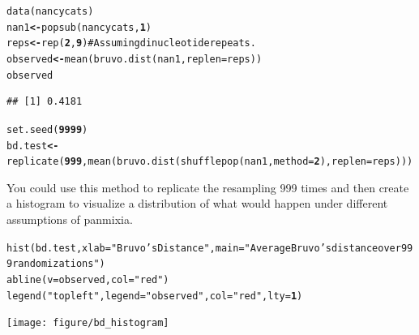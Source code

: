 \documentclass[letterpaper]{article}\usepackage[]{graphicx}\usepackage[]{color}
\makeatletter
\newcommand{\hlnum}[1]{\textcolor[rgb]{0.502,0,0.502}{\textbf{#1}}}%
\newcommand{\hlstr}[1]{\textcolor[rgb]{0.651,0.522,0}{#1}}%
\newcommand{\hlcom}[1]{\textcolor[rgb]{1,0.502,0}{#1}}%
\newcommand{\hlstd}[1]{\textcolor[rgb]{0,0,0}{#1}}%
\newcommand{\hlkwb}[1]{\textcolor[rgb]{0.502,0.502,0.753}{\textbf{#1}}}%
\newcommand{\hlkwc}[1]{\textcolor[rgb]{0,0.502,0.753}{#1}}%
\newcommand{\hlkwd}[1]{\textcolor[rgb]{0,0.267,0.4}{#1}}%
\newenvironment{kframe}{%
 \def\at@end@of@kframe{}%
 \ifinner\ifhmode%
  \def\at@end@of@kframe{\end{minipage}}%
  \begin{minipage}{\columnwidth}%
 \fi\fi%
 \def\FrameCommand##1{\hskip\@totalleftmargin \hskip-\fboxsep
 \colorbox{shadecolor}{##1}\hskip-\fboxsep
     \hskip-\linewidth \hskip-\@totalleftmargin \hskip\columnwidth}%
 \MakeFramed {\advance\hsize-\width
   \@totalleftmargin\z@ \linewidth\hsize
   \@setminipage}}%
 {\par\unskip\endMakeFramed%
 \at@end@of@kframe}
\newenvironment{knitrout}{}{} %
\makeatother
\begin{document}
\begin{knitrout}\footnotesize
{}\color{fgcolor}\begin{kframe}
\begin{alltt}
\hlkwd{data}\hlstd{(nancycats)}
\hlstd{nan1} \hlkwb{<-} \hlkwd{popsub}\hlstd{(nancycats,} \hlnum{1}\hlstd{)}
\hlstd{reps} \hlkwb{<-} \hlkwd{rep}\hlstd{(}\hlnum{2}\hlstd{,} \hlnum{9}\hlstd{)}  \hlcom{# Assuming dinucleotide repeats.}
\hlstd{observed} \hlkwb{<-} \hlkwd{mean}\hlstd{(}\hlkwd{bruvo.dist}\hlstd{(nan1,} \hlkwc{replen} \hlstd{= reps))}
\hlstd{observed}
\end{alltt}
\begin{verbatim}
## [1] 0.4181
\end{verbatim}
\end{kframe}
\end{knitrout}

\begin{knitrout}\footnotesize
{}\color{fgcolor}\begin{kframe}
\begin{alltt}
\hlkwd{set.seed}\hlstd{(}\hlnum{9999}\hlstd{)}
\hlstd{bd.test} \hlkwb{<-} \hlkwd{replicate}\hlstd{(}\hlnum{999}\hlstd{,} \hlkwd{mean}\hlstd{(}\hlkwd{bruvo.dist}\hlstd{(}\hlkwd{shufflepop}\hlstd{(nan1,} \hlkwc{method} \hlstd{=} \hlnum{2}\hlstd{),} \hlkwc{replen} \hlstd{= reps)))}
\end{alltt}
\end{kframe}
\end{knitrout}



You could use this method to replicate the resampling 999 times and then create a histogram to visualize a distribution of what would happen under different assumptions of panmixia.

\begin{knitrout}\footnotesize
{}\color{fgcolor}\begin{kframe}
\begin{alltt}
\hlkwd{hist}\hlstd{(bd.test,} \hlkwc{xlab} \hlstd{=} \hlstr{"Bruvo's Distance"}\hlstd{,} \hlkwc{main} \hlstd{=} \hlstr{"Average Bruvo's distance over 999 randomizations"}\hlstd{)}
\hlkwd{abline}\hlstd{(}\hlkwc{v} \hlstd{= observed,} \hlkwc{col} \hlstd{=} \hlstr{"red"}\hlstd{)}
\hlkwd{legend}\hlstd{(}\hlstr{"topleft"}\hlstd{,} \hlkwc{legend} \hlstd{=} \hlstr{"observed"}\hlstd{,} \hlkwc{col} \hlstd{=} \hlstr{"red"}\hlstd{,} \hlkwc{lty} \hlstd{=} \hlnum{1}\hlstd{)}
\end{alltt}
\end{kframe}

{\centering \texttt{[image: figure/bd\_histogram]} 

}



\end{knitrout}
\end{document}
